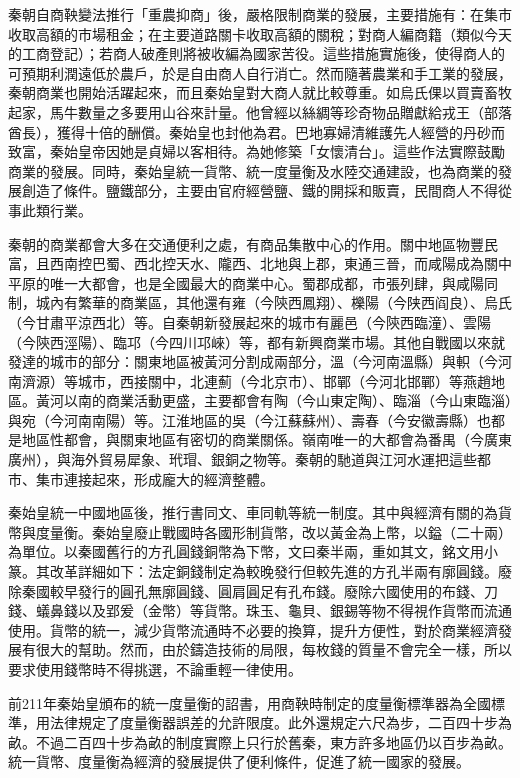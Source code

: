 秦朝自商鞅變法推行「重農抑商」後，嚴格限制商業的發展，主要措施有：在集市收取高額的市場租金；在主要道路關卡收取高額的關稅；對商人編商籍（類似今天的工商登記）；若商人破產則將被收編為國家苦役。這些措施實施後，使得商人的可預期利潤遠低於農戶，於是自由商人自行消亡。然而隨著農業和手工業的發展，秦朝商業也開始活躍起來，而且秦始皇對大商人就比較尊重。如烏氏倮以買賣畜牧起家，馬牛數量之多要用山谷來計量。他曾經以絲綢等珍奇物品贈獻給戎王（部落酋長），獲得十倍的酬償。秦始皇也封他為君。巴地寡婦清維護先人經營的丹砂而致富，秦始皇帝因她是貞婦以客相待。為她修築「女懷清台」。這些作法實際鼓勵商業的發展。同時，秦始皇統一貨幣、統一度量衡及水陸交通建設，也為商業的發展創造了條件。鹽鐵部分，主要由官府經營鹽、鐵的開採和販賣，民間商人不得從事此類行業。

秦朝的商業都會大多在交通便利之處，有商品集散中心的作用。關中地區物豐民富，且西南控巴蜀、西北控天水、隴西、北地與上郡，東通三晉，而咸陽成為關中平原的唯一大都會，也是全國最大的商業中心。蜀郡成都，市張列肆，與咸陽同制，城內有繁華的商業區，其他還有雍（今陝西鳳翔）、櫟陽（今陕西阎良）、烏氏（今甘肅平涼西北）等。自秦朝新發展起來的城市有麗邑（今陝西臨潼）、雲陽（今陝西涇陽）、臨邛（今四川邛崍）等，都有新興商業市場。其他自戰國以來就發達的城市的部分：關東地區被黃河分割成兩部分，溫（今河南溫縣）與軹（今河南濟源）等城市，西接關中，北連薊（今北京市）、邯鄲（今河北邯鄲）等燕趙地區。黃河以南的商業活動更盛，主要都會有陶（今山東定陶）、臨淄（今山東臨淄）與宛（今河南南陽）等。江淮地區的吳（今江蘇蘇州）、壽春（今安徽壽縣）也都是地區性都會，與關東地區有密切的商業關係。嶺南唯一的大都會為番禺（今廣東廣州），與海外貿易犀象、玳瑁、銀銅之物等。秦朝的馳道與江河水運把這些都市、集市連接起來，形成龐大的經濟整體。

秦始皇統一中國地區後，推行書同文、車同軌等統一制度。其中與經濟有關的為貨幣與度量衡。秦始皇廢止戰國時各國形制貨幣，改以黃金為上幣，以鎰（二十兩）為單位。以秦國舊行的方孔圓錢銅幣為下幣，文曰秦半兩，重如其文，銘文用小篆。其改革詳細如下：法定銅錢制定為較晚發行但較先進的方孔半兩有廓圓錢。廢除秦國較早發行的圓孔無廓圓錢、圓肩圓足有孔布錢。廢除六國使用的布錢、刀錢、蟻鼻錢以及郢爰（金幣）等貨幣。珠玉、龜貝、銀錫等物不得視作貨幣而流通使用。貨幣的統一，減少貨幣流通時不必要的換算，提升方便性，對於商業經濟發展有很大的幫助。然而，由於鑄造技術的局限，每枚錢的質量不會完全一樣，所以要求使用錢幣時不得挑選，不論重輕一律使用。

前211年秦始皇頒布的統一度量衡的詔書，用商鞅時制定的度量衡標準器為全國標準，用法律規定了度量衡器誤差的允許限度。此外還規定六尺為步，二百四十步為畝。不過二百四十步為畝的制度實際上只行於舊秦，東方許多地區仍以百步為畝。統一貨幣、度量衡為經濟的發展提供了便利條件，促進了統一國家的發展。

